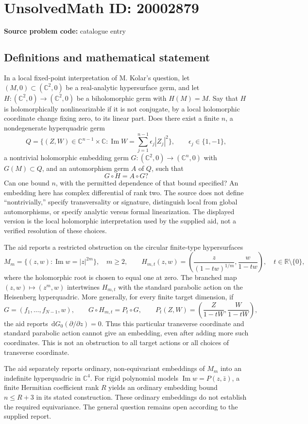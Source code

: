 \documentclass[11pt]{article}
\newcommand{\R}{\mathbb{R}}
\newcommand{\C}{\mathbb{C}}
\newcommand{\dd}{\,\mathrm{d}}
\begin{document}
\section*{UnsolvedMath ID: 20002879}
\textbf{Source problem code:} catalogue entry
\subsection{Definitions and mathematical statement}
In a local fixed-point interpretation of M. Kolar's question, let \((M,0)\subset(\C^2,0)\) be a real-analytic hypersurface germ, and let \(H:(\C^2,0)\to(\C^2,0)\) be a biholomorphic germ with \(H(M)=M\). Say that \(H\) is holomorphically nonlinearizable if it is not conjugate, by a local holomorphic coordinate change fixing zero, to its linear part. Does there exist a finite \(n\), a nondegenerate hyperquadric germ
\[
Q=\{(Z,W)\in\C^{n-1}\times\C:\operatorname{Im}W=\sum_{j=1}^{n-1}\epsilon_j|Z_j|^2\},\qquad \epsilon_j\in\{1,-1\},
\]
a nontrivial holomorphic embedding germ \(G:(\C^2,0)\to(\C^n,0)\) with \(G(M)\subset Q\), and an automorphism germ \(A\) of \(Q\), such that
\[
G\circ H=A\circ G?
\]
Can one bound \(n\), with the permitted dependence of that bound specified? An embedding here has complex differential of rank two. The source does not define ``nontrivially,'' specify transversality or signature, distinguish local from global automorphisms, or specify analytic versus formal linearization. The displayed version is the local holomorphic interpretation used by the supplied aid, not a verified resolution of these choices.

The aid reports a restricted obstruction on the circular finite-type hypersurfaces
\[
M_m=\{(z,w):\operatorname{Im}w=|z|^{2m}\},\quad m\ge2,\qquad
H_{m,t}(z,w)=\left(\frac{z}{(1-tw)^{1/m}},\frac{w}{1-tw}\right),\quad t\in\R\setminus\{0\},
\]
where the holomorphic root is chosen to equal one at zero. The branched map \((z,w)\mapsto(z^m,w)\) intertwines \(H_{m,t}\) with the standard parabolic action on the Heisenberg hyperquadric. More generally, for every finite target dimension, if
\[
G=(f_1,\ldots,f_{N-1},w),\qquad
G\circ H_{m,t}=P_t\circ G,\qquad
P_t(Z,W)=\left(\frac{Z}{1-tW},\frac{W}{1-tW}\right),
\]
the aid reports \(\dd G_0(\partial/\partial z)=0\). Thus this particular transverse coordinate and standard parabolic action cannot give an embedding, even after adding more such coordinates. This is not an obstruction to all target actions or all choices of transverse coordinate.

The aid separately reports ordinary, non-equivariant embeddings of \(M_m\) into an indefinite hyperquadric in \(\C^4\). For rigid polynomial models \(\operatorname{Im}w=P(z,\bar z)\), a finite Hermitian coefficient rank \(R\) yields an ordinary embedding bound \(n\le R+3\) in its stated construction. These ordinary embeddings do not establish the required equivariance. The general question remains open according to the supplied report.
\end{document}
